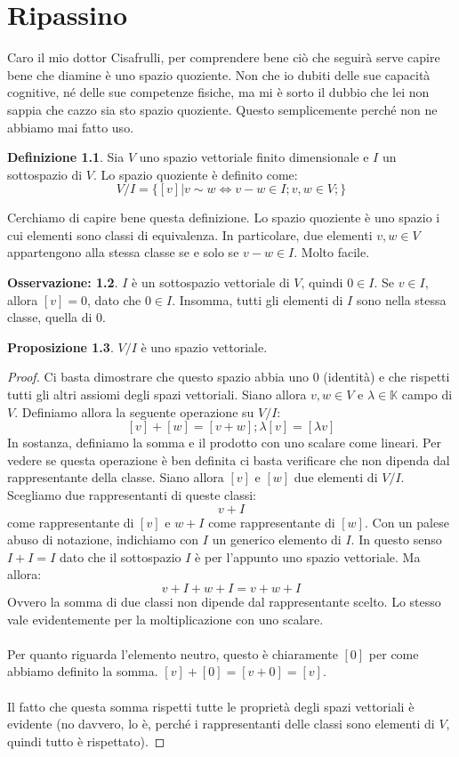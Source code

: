 \documentclass[12pt,a4paper]{report}
\theoremstyle{definition}
\newtheorem{Def}{Definizione}[chapter]
\theoremstyle{Theorem}
\newtheorem{Prop}[Def]{Proposizione}
\theoremstyle{definition}
\theoremstyle{definition}
\theoremstyle{definition}
\newtheorem{Obs}[Def]{Osservazione:}
\begin{document}
	\chapter{Ripassino}
	Caro il mio dottor Cisafrulli, per comprendere bene ciò che seguirà serve capire bene che diamine è uno spazio quoziente. Non che io dubiti delle sue capacità cognitive, né delle sue competenze fisiche, ma mi è sorto il dubbio che lei non sappia che cazzo sia sto spazio quoziente. Questo semplicemente perché non ne abbiamo mai fatto uso.
	\begin{Def}
		Sia $V$ uno spazio vettoriale finito dimensionale e $I$ un sottospazio di $V$. Lo spazio quoziente è definito come:
		$$V/I=\{[v]|v\sim w \iff v-w\in I;v,w\in V; \}$$
	\end{Def}
	Cerchiamo di capire bene questa definizione. Lo spazio quoziente è uno spazio i cui elementi sono classi di equivalenza. In particolare, due elementi $v,w\in V$ appartengono alla stessa classe se e solo se $v-w\in I$. Molto facile.
	\begin{Obs}
		$I$ è un sottospazio vettoriale di $V$, quindi $0\in I$. Se $v\in I$, allora $[v]=0$, dato che $0\in I$. Insomma, tutti gli elementi di $I$ sono nella stessa classe, quella di $0$.
	\end{Obs}
	\begin{Prop}
		$V/I$ è uno spazio vettoriale.
	\end{Prop}
	\begin{proof}
		Ci basta dimostrare che questo spazio abbia uno $0$ (identità) e che rispetti tutti gli altri assiomi degli spazi vettoriali.
		Siano allora $v,w\in V$ e $\lambda\in \mathbb{K}$ campo di $V$. Definiamo allora la seguente operazione su $V/I$:
		$$[v]+[w]=[v+w]; \lambda[v]=[\lambda v]$$
		In sostanza, definiamo la somma e il prodotto con uno scalare come lineari. Per vedere se questa operazione è ben definita ci basta verificare che non dipenda dal rappresentante della classe. Siano allora $[v]$ e $[w]$ due elementi di $V/I$. Scegliamo due rappresentanti di queste classi:
		$$v+I$$ come rappresentante di $[v]$ e $w+I$ come rappresentante di $[w]$. Con un palese abuso di notazione, indichiamo con $I$ un generico elemento di $I$. In questo senso $I+I=I$ dato che il sottospazio $I$ è per l'appunto uno spazio vettoriale. Ma allora:
		$$v+I+w+I=v+w+I$$
		Ovvero la somma di due classi non dipende dal rappresentante scelto. Lo stesso vale evidentemente per la moltiplicazione con uno scalare.\\
		\\
		Per quanto riguarda l'elemento neutro, questo è chiaramente $[0]$ per come abbiamo definito la somma. $[v]+[0]=[v+0]=[v]$.\\
		\\
		Il fatto che questa somma rispetti tutte le proprietà degli spazi vettoriali è evidente (no davvero, lo è, perché i rappresentanti delle classi sono elementi di $V$, quindi tutto è rispettato). 	
	\end{proof}
\end{document}

